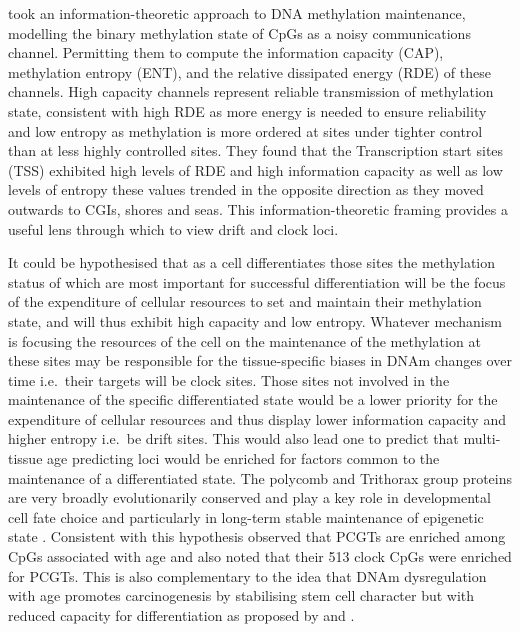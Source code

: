 \documentclass[
]{book}
\begin{document}
\citet{Jenkinson2017} took an information-theoretic approach to DNA methylation maintenance, modelling the binary methylation state of CpGs as a noisy communications channel. Permitting them to compute the information capacity (CAP), methylation entropy (ENT), and the relative dissipated energy (RDE) of these channels. High capacity channels represent reliable transmission of methylation state, consistent with high RDE as more energy is needed to ensure reliability and low entropy as methylation is more ordered at sites under tighter control than at less highly controlled sites. They found that the Transcription start sites (TSS) exhibited high levels of RDE and high information capacity as well as low levels of entropy these values trended in the opposite direction as they moved outwards to CGIs, shores and seas. This information-theoretic framing provides a useful lens through which to view drift and clock loci.

It could be hypothesised that as a cell differentiates those sites the methylation status of which are most important for successful differentiation will be the focus of the expenditure of cellular resources to set and maintain their methylation state, and will thus exhibit high capacity and low entropy. Whatever mechanism is focusing the resources of the cell on the maintenance of the methylation at these sites may be responsible for the tissue-specific biases in DNAm changes over time i.e.~their targets will be clock sites. Those sites not involved in the maintenance of the specific differentiated state would be a lower priority for the expenditure of cellular resources and thus display lower information capacity and higher entropy i.e.~be drift sites. This would also lead one to predict that multi-tissue age predicting loci would be enriched for factors common to the maintenance of a differentiated state. The polycomb and Trithorax group proteins are very broadly evolutionarily conserved and play a key role in developmental cell fate choice and particularly in long-term stable maintenance of epigenetic state \citep{Schuettengruber2017}. Consistent with this hypothesis \citet{Teschendorff2010} observed that PCGTs are enriched among CpGs associated with age and \citet{Levine2018} also noted that their 513 clock CpGs were enriched for PCGTs. This is also complementary to the idea that DNAm dysregulation with age promotes carcinogenesis by stabilising stem cell character but with reduced capacity for differentiation as proposed by \citet{Teschendorff2010} and \citet{Rakyan2010}.
\end{document}
